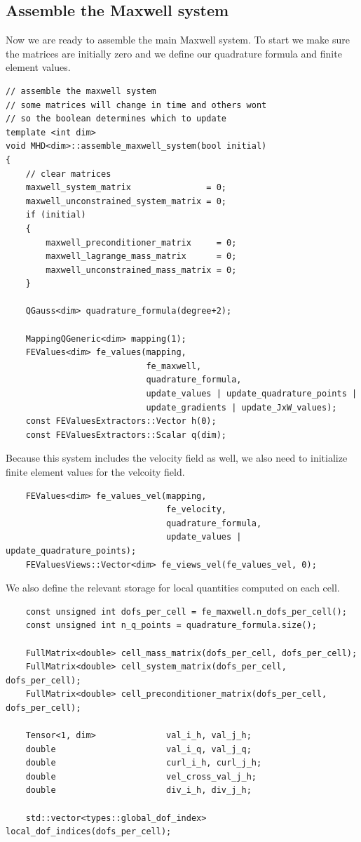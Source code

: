\documentclass{article}
\begin{document}
\subsection*{Assemble the Maxwell system}
Now we are ready to assemble the main Maxwell system. To start we make sure the matrices are initially zero and we define our quadrature formula and finite element values. 
\begin{lstlisting}
// assemble the maxwell system
// some matrices will change in time and others wont
// so the boolean determines which to update
template <int dim>
void MHD<dim>::assemble_maxwell_system(bool initial)
{
    // clear matrices
    maxwell_system_matrix               = 0;
    maxwell_unconstrained_system_matrix = 0;
    if (initial)
    {
        maxwell_preconditioner_matrix     = 0;
        maxwell_lagrange_mass_matrix      = 0;
        maxwell_unconstrained_mass_matrix = 0;
    }

    QGauss<dim> quadrature_formula(degree+2);

    MappingQGeneric<dim> mapping(1);
    FEValues<dim> fe_values(mapping,
                            fe_maxwell,
                            quadrature_formula,
                            update_values | update_quadrature_points |
                            update_gradients | update_JxW_values);
    const FEValuesExtractors::Vector h(0);
    const FEValuesExtractors::Scalar q(dim);
\end{lstlisting}
Because this system includes the velocity field as well, we also need to initialize finite element values for the velcoity field.
\begin{lstlisting}
    FEValues<dim> fe_values_vel(mapping,
                                fe_velocity,
                                quadrature_formula,
                                update_values | update_quadrature_points);
    FEValuesViews::Vector<dim> fe_views_vel(fe_values_vel, 0);
\end{lstlisting}
We also define the relevant storage for local quantities computed on each cell.
\begin{lstlisting}
    const unsigned int dofs_per_cell = fe_maxwell.n_dofs_per_cell();
    const unsigned int n_q_points = quadrature_formula.size();

    FullMatrix<double> cell_mass_matrix(dofs_per_cell, dofs_per_cell);
    FullMatrix<double> cell_system_matrix(dofs_per_cell, dofs_per_cell);
    FullMatrix<double> cell_preconditioner_matrix(dofs_per_cell, dofs_per_cell);

    Tensor<1, dim>              val_i_h, val_j_h;
    double                      val_i_q, val_j_q;
    double                      curl_i_h, curl_j_h;
    double                      vel_cross_val_j_h;
    double                      div_i_h, div_j_h;

    std::vector<types::global_dof_index> local_dof_indices(dofs_per_cell);
    \end{lstlisting}
\end{document}
